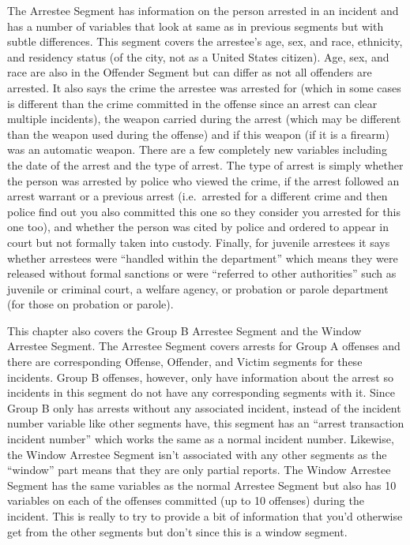 \documentclass[
  12pt,
  openany]{book}
\begin{document}
The Arrestee Segment has information on the person arrested in an incident and has a number of variables that look at same as in previous segments but with subtle differences. This segment covers the arrestee's age, sex, and race, ethnicity, and residency status (of the city, not as a United States citizen). Age, sex, and race are also in the Offender Segment but can differ as not all offenders are arrested. It also says the crime the arrestee was arrested for (which in some cases is different than the crime committed in the offense since an arrest can clear multiple incidents), the weapon carried during the arrest (which may be different than the weapon used during the offense) and if this weapon (if it is a firearm) was an automatic weapon. There are a few completely new variables including the date of the arrest and the type of arrest. The type of arrest is simply whether the person was arrested by police who viewed the crime, if the arrest followed an arrest warrant or a previous arrest (i.e.~arrested for a different crime and then police find out you also committed this one so they consider you arrested for this one too), and whether the person was cited by police and ordered to appear in court but not formally taken into custody. Finally, for juvenile arrestees it says whether arrestees were ``handled within the department'' which means they were released without formal sanctions or were ``referred to other authorities'' such as juvenile or criminal court, a welfare agency, or probation or parole department (for those on probation or parole).

This chapter also covers the Group B Arrestee Segment and the Window Arrestee Segment. The Arrestee Segment covers arrests for Group A offenses and there are corresponding Offense, Offender, and Victim segments for these incidents. Group B offenses, however, only have information about the arrest so incidents in this segment do not have any corresponding segments with it. Since Group B only has arrests without any associated incident, instead of the incident number variable like other segments have, this segment has an ``arrest transaction incident number'' which works the same as a normal incident number. Likewise, the Window Arrestee Segment isn't associated with any other segments as the ``window'' part means that they are only partial reports. The Window Arrestee Segment has the same variables as the normal Arrestee Segment but also has 10 variables on each of the offenses committed (up to 10 offenses) during the incident. This is really to try to provide a bit of information that you'd otherwise get from the other segments but don't since this is a window segment.
\end{document}
